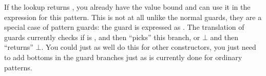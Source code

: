 \noindent
If the lookup returns , you already have the value 
bound and can use it in the expression for this pattern. This is not
at all unlike the normal guards, they are a special case of pattern
guards: the guard  is expressed as
. The translation of guards currently checks if
 is , and then ``picks'' this branch, or $\bot$ and
then ``returns'' $\bot$. You could just as well do this for other
constructors, you just need to add bottoms in the guard branches just
as is currently done for ordinary patterns.

